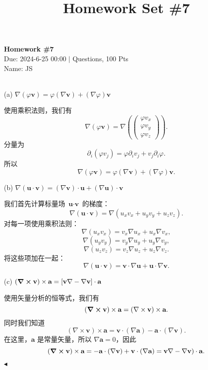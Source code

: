 \documentclass[11pt]{article}
\title{Homework Set \#7}
\newenvironment{question}[2][Question]{\begin{trivlist}
\item[\hskip \labelsep {\bfseries #1}\hskip \labelsep {\bfseries #2.}]}{\hfill$\blacktriangleleft$\end{trivlist}}
\begin{document}
    \pagestyle{fancy}
    \chead{}

    \begin{center}
        {\LARGE \bf Homework \#7}\\
        {Due: 2024-6-25 00:00 \quad$|$ Questions, 100 Pts}\\
        {Name: JS}
    \end{center}

    \begin{question}{1 (42') (矢量微分恒等式)}~\\
        
         (a) \(\nabla(\varphi \textbf{v}) = \varphi(\nabla\textbf{v})+(\nabla\varphi)\textbf{v}\)
        
        使用乘积法则，我们有
        \[
        \nabla(\varphi \textbf{v}) = \nabla \left( \begin{pmatrix}
            \varphi v_x \\
            \varphi v_y \\
            \varphi v_z
        \end{pmatrix} \right).
        \]
        分量为
        \[
        \partial_i(\varphi v_j) = \varphi \partial_i v_j + v_j \partial_i \varphi.
        \]
        所以
        \[
        \nabla(\varphi \textbf{v}) = \varphi (\nabla \textbf{v}) + (\nabla \varphi) \textbf{v}.
        \]
        
         (b) \(\nabla(\textbf{u}\cdot \textbf{v}) = (\nabla\textbf{v})\cdot\textbf{u}+(\nabla\textbf{u})\cdot\textbf{v}\)
        
        我们首先计算标量场 \(\textbf{u} \cdot \textbf{v}\) 的梯度：
        \[
        \nabla(\textbf{u} \cdot \textbf{v}) = \nabla(u_x v_x + u_y v_y + u_z v_z).
        \]
        对每一项使用乘积法则：
        \[
        \nabla(u_x v_x) = v_x \nabla u_x + u_x \nabla v_x,
        \]
        \[
        \nabla(u_y v_y) = v_y \nabla u_y + u_y \nabla v_y,
        \]
        \[
        \nabla(u_z v_z) = v_z \nabla u_z + u_z \nabla v_z.
        \]
        将这些项加在一起：
        \[
        \nabla(\textbf{u} \cdot \textbf{v}) = \textbf{v} \cdot \nabla \textbf{u} + \textbf{u} \cdot \nabla \textbf{v}.
        \]
        
         (c) \((\curl \textbf{v})\times\textbf{a}=[\textbf{v}\nabla-\nabla\textbf{v}]\cdot\textbf{a}\)
        
        使用矢量分析的恒等式，我们有
        \[
        (\curl \textbf{v})\times\textbf{a} = (\nabla \times \textbf{v}) \times \textbf{a}.
        \]
        同时我们知道
        \[
        (\nabla \times \textbf{v}) \times \textbf{a} = \textbf{v} \cdot (\nabla \textbf{a}) - \textbf{a} \cdot (\nabla \textbf{v}).
        \]
        在这里，\(\textbf{a}\) 是常量矢量，所以 \(\nabla \textbf{a} = 0\)，因此
        \[
        (\curl \textbf{v})\times\textbf{a} = - \textbf{a} \cdot (\nabla \textbf{v}) + \textbf{v} \cdot (\nabla \textbf{a}) = \textbf{v} \nabla - \nabla \textbf{v}) \cdot \textbf{a}.
        \]
        

\end{question}
\end{document}
